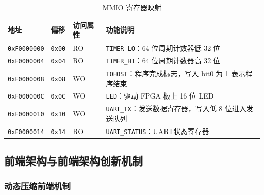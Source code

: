 ﻿\documentclass[12pt,a4paper]{ctexart}
\begin{document}
    \begin{table}[H]
      \centering
      \caption{MMIO 寄存器映射}
      \label{tab:mmio_map}
      \begin{tabularx}{\textwidth}{lllX}
          \toprule
          地址 & 偏移 & 访问属性 & 功能说明 \\
          \midrule
          \texttt{0xF0000000}
          & \texttt{0x00}
          & RO
          & \texttt{TIMER\_LO}：64 位周期计数器低 32 位 \\

          \texttt{0xF0000004}
          & \texttt{0x04}
          & RO
          & \texttt{TIMER\_HI}：64 位周期计数器高 32 位 \\

          \texttt{0xF0000008}
          & \texttt{0x08}
          & WO
          & \texttt{TOHOST}：程序完成标志，写入 bit0 为 1 表示程序结束 \\

          \texttt{0xF000000C}
          & \texttt{0x0C}
          & WO
          & \texttt{LED}：驱动 FPGA 板上 16 位 LED \\

          \texttt{0xF0000010}
          & \texttt{0x10}
          & WO
          & \texttt{UART\_TX}：发送数据寄存器，写入低 8 位进入发送队列 \\

          \texttt{0xF0000014}
          & \texttt{0x14}
          & RO
          & \texttt{UART\_STATUS}：UART状态寄存器 \\
          \bottomrule
      \end{tabularx}
  \end{table}
\subsection{前端架构与前端架构创新机制}
\subsubsection{动态压缩前端机制}
\end{document}

